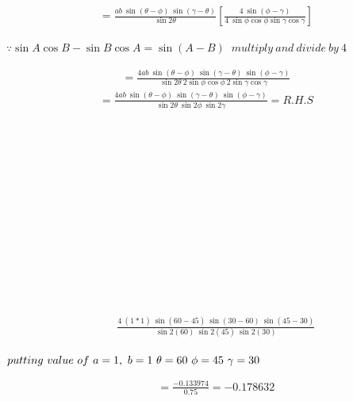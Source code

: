 \documentclass[journal,12pt,twocolumn]{IEEEtran}
\begin{document}
\vspace{0.3cm}
\begin{multline}
=\frac{ab~\sin(\theta-\phi)~\sin(\gamma-\theta)}{ \sin2\theta}\left[\frac{4~\sin(\phi-\gamma)}{4~\sin\phi\cos\phi\sin\gamma\cos\gamma}
\right]
\end{multline}
\begin{flushright}
$\because \sin A\cos B - \sin B\cos A = \sin(A-B)$
$~multiply ~and ~divide ~by ~4$
\end{flushright}

\vspace{0.3cm}
\begin{multline}
=\frac{4ab~\sin(\theta-\phi)~\sin(\gamma-\theta)~\sin(\phi-\gamma)}{ \sin2\theta~2\sin\phi\cos\phi~2\sin\gamma\cos\gamma}
\end{multline}
\vspace{0.3cm}
\begin{multline*}
=\frac{4ab~\sin(\theta-\phi)~\sin(\gamma-\theta)~\sin(\phi-\gamma)}{ \sin2\theta~\sin2\phi~\sin2\gamma} = R.H.S
\end{multline*}
\\\\\\\\\\\\\\\\\\\\\\\\\
\begin{multline*}
~~~~~~~~\frac{4~(1*1)~\sin(60-45)~\sin(30-60)~\sin(45-30)}{ \sin2(60)~\sin2(45)~\sin2(30)}\\
\end{multline*}
\begin{flushright}
$
putting~ value~ of~a=1,~b=1 ~\theta=60\\~\phi=45 ~\gamma=30$
\end{flushright}

\begin{multline*}
~~~~~~~~=\frac{-0.133974}{0.75}=-0.178632\\
\end{multline*}
\end{document}

